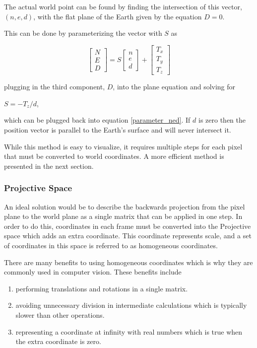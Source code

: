  The actual world point can be found by finding the intersection of this vector, $(n,e,d)$, with the flat plane of the Earth given by the equation $D=0$.  
 
 This can be done by parameterizing the vector with $S$ as 
 
 \begin{equation}
 \label{parameter_ned}
 \begin{bmatrix} N \\ E \\ D \end{bmatrix} =
 S \begin{bmatrix} n \\ e \\ d \end{bmatrix}
 + \begin{bmatrix} T_x \\ T_y \\ T_z \end{bmatrix}
 \end{equation}
 
 plugging in the third component, $D$, into the plane equation and solving for
 \begin{center}
 $S = -T_z / d$, 
 \end{center}
 which can be plugged back into equation \ref{parameter_ned}.  If $d$ is zero then the position vector is parallel to the Earth's surface and will never intersect it.   

 While this method is easy to visualize, it requires multiple steps for each pixel that must be converted to world coordinates.  A more efficient method is presented in the next section.

 \subsubsection{Projective Space}
 \label{section:projection_space}
 
 An ideal solution would be to describe the backwards projection from the pixel plane to the world plane as a single matrix that can be applied in one step.  In order to do this, coordinates in each frame must be converted into the Projective space which adds an extra coordinate.  This coordinate represents scale, and a set of coordinates in this space is referred to as homogeneous coordinates.

 There are many benefits to using homogeneous coordinates which is why they are commonly used in computer vision.  These benefits include
 \begin{enumerate}
 \item performing translations and rotations in a single matrix.
 \item avoiding unnecessary division in intermediate calculations which is typically slower than other operations.
 \item representing a coordinate at infinity with real numbers which is true when the extra coordinate is zero.
 \end{enumerate}
 
